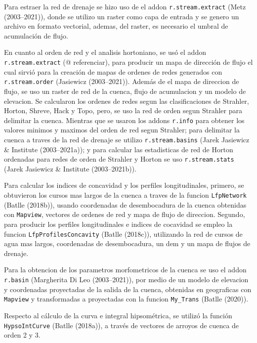 \documentclass[11pt,]{article}
\begin{document}
Para estraer la red de drenaje se hizo uso de el addon
\texttt{r.stream.extract} (Metz (2003--2021)), donde se utilizo un
raster como capa de entrada y se genero un archivo en formato vectorial,
ademas, del raster, es necesario el umbral de acumulación de flujo.

En cuanto al orden de red y el analisis hortoniano, se usó el addon
\texttt{r.stream.extract} (@ referenciar), para producir un mapa de
dirección de flujo el cual sirvió para la creación de mapas de ordenes
de redes generados con \texttt{r.stream.order} (Jasiewicz (2003--2021)).
Además de el mapa de direccion de flujo, se uso un raster de red de la
cuenca, flujo de acumulacion y un modelo de elevacion. Se calcularon los
ordenes de redes segun las clasificaciones de Strahler, Horton, Shreve,
Hack y Topo, pero, se uso la red de orden segun Strahler para delimitar
la cuenca. Mientras que se usaron los addons \texttt{r.info} para
obtener los valores minimos y maximos del orden de red segun Strahler;
para delimitar la cuenca a traves de la red de drenaje se utilizo
\texttt{r.stream.basins} (Jarek Jasiewicz \& Institute (2003--2021a)); y
para calcular las estadisticas de red de Horton ordenadas para redes de
orden de Strahler y Horton se uso \texttt{r.stream.stats} (Jarek
Jasiewicz \& Institute (2003--2021b)).

Para calcular los indices de concavidad y los perfiles longitudinales,
primero, se obtuvieron los cursos mas largos de la cuenca a traves de la
funcion \texttt{LfpNetwork} (Batlle (2018b)), usando coordenadas de
desembocadura de la cuenca obtenidas con \texttt{Mapview}, vectores de
ordenes de red y mapa de flujo de direccion. Segundo, para producir los
perfiles longitudinales e indices de cocavidad se empleo la funcion
\texttt{LfpProfilesConcavity} (Batlle (2018c)), utilizando la red de
cursos de agua mas largos, coordenadas de desembocadura, un dem y un
mapa de flujos de drenaje.

Para la obtencion de los parametros morfometricos de la cuenca se uso el
addon \texttt{r.basin} (Margherita Di Leo (2003--2021)), por medio de un
modelo de elevacion y coordenadas proyectadas de la salida de la cuenca,
obtenidas en geograficas con \texttt{Mapview} y transformadas a
proyectadas con la funcion \texttt{My\_Trans} (Batlle (2020)).

Respecto al cálculo de la curva e integral hipsométrica, se utilizó la
función \texttt{HypsoIntCurve} (Batlle (2018a)), a través de vectores de
arroyos de cuenca de orden 2 y 3.
\end{document}
